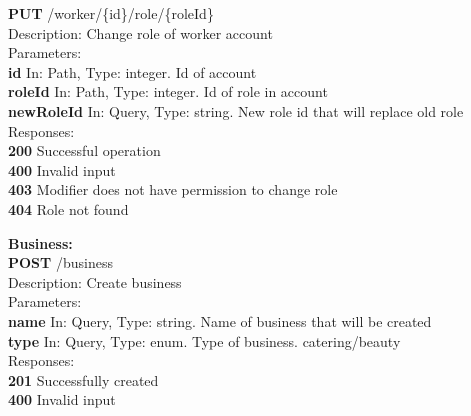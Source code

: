 \documentclass[11pt,a4paper,pdftex]{article}
\begin{document}
\hspace*{1em}\textbf{PUT} /worker/\{id\}/role/\{roleId\}\\
\hspace*{2em}Description: Change role of worker account\\
\hspace*{2em}Parameters:\\
\hspace*{3em}\textbf{id} In: Path, Type: integer. Id of account\\
\hspace*{3em}\textbf{roleId} In: Path, Type: integer. Id of role in account\\
\hspace*{3em}\textbf{newRoleId} In: Query, Type: string. New role id that will replace old role\\
\hspace*{2em}Responses:\\
\hspace*{3em}\textbf{200} Successful operation\\
\hspace*{3em}\textbf{400} Invalid input\\
\hspace*{3em}\textbf{403} Modifier does not have permission to change role\\
\hspace*{3em}\textbf{404} Role not found

\textbf{Business:}\\
\hspace*{1em}\textbf{POST} /business\\
\hspace*{2em}Description: Create business\\
\hspace*{2em}Parameters:\\
\hspace*{3em}\textbf{name} In: Query, Type: string. Name of business that will be created\\
\hspace*{3em}\textbf{type} In: Query, Type: enum. Type of business. catering/beauty\\
\hspace*{2em}Responses:\\
\hspace*{3em}\textbf{201} Successfully created\\
\hspace*{3em}\textbf{400} Invalid input
\end{document}
